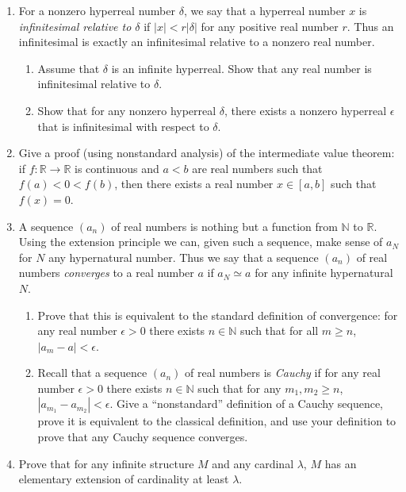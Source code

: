 \documentclass{amsart}
\theoremstyle{definition}
\begin{document}
\begin{enumerate}
\item For a nonzero hyperreal number $\delta$, we say that a hyperreal number $x$ is \emph{infinitesimal relative to $\delta$} if $|x| < r |\delta|$ for any positive real number $r$. Thus an infinitesimal is exactly an infinitesimal relative to a nonzero real number.

  \begin{enumerate}
  \item Assume that $\delta$ is an infinite hyperreal. Show that any real number is infinitesimal relative to $\delta$.
  \item Show that for any nonzero hyperreal $\delta$, there exists a nonzero hyperreal $\epsilon$ that is infinitesimal with respect to $\delta$.
  \end{enumerate}
  
\item Give a proof (using nonstandard analysis) of the intermediate value theorem: if $f: \mathbb{R} \to \mathbb{R}$ is continuous and $a < b$ are real numbers such that $f (a) < 0 < f (b)$, then there exists a real number $x \in [a,b]$ such that $f (x) = 0$.

\item A sequence $(a_n)$ of real numbers is nothing but a function from $\mathbb{N}$ to $\mathbb{R}$. Using the extension principle we can, given such a sequence, make sense of $a_N$ for $N$ any hypernatural number. Thus we say that a sequence $(a_n)$ of real numbers \emph{converges} to a real number $a$ if $a_N \simeq a$ for any infinite hypernatural $N$.

  \begin{enumerate}
  \item Prove that this is equivalent to the standard definition of convergence: for any real number $\epsilon > 0$ there exists $n \in \mathbb{N}$ such that for all $m \ge n$, $|a_m - a| < \epsilon$.
  \item Recall that a sequence $(a_n)$ of real numbers is \emph{Cauchy} if for any real number $\epsilon > 0$ there exists $n \in \mathbb{N}$ such that for any $m_1, m_2 \ge n$, $|a_{m_1} - a_{m_2}| < \epsilon$. Give a ``nonstandard'' definition of a Cauchy sequence, prove it is equivalent to the classical definition, and use your definition to prove that any Cauchy sequence converges.
  \end{enumerate}

\item Prove that for any infinite structure $M$ and any cardinal $\lambda$, $M$ has an elementary extension of cardinality at least $\lambda$.
  

\end{enumerate}
\end{document}
